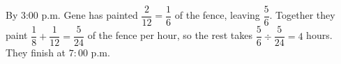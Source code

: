 By 3:00 p.m. Gene has painted $\dfrac{2}{12}=\dfrac{1}{6}$ of the fence, leaving $\dfrac{5}{6}$. Together they paint $\dfrac{1}{8}+\dfrac{1}{12}=\dfrac{5}{24}$ of the fence per hour, so the rest takes $\dfrac{5}{6}\div\dfrac{5}{24}=4$ hours. They finish at $\boxed{7{:}00\text{ p.m.}}$
